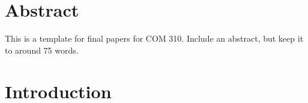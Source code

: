 \documentclass[
	title={TITLE FOR YOUR COM 310 FINAL PAPER},
	keywords={language models}
]{com310final}
\begin{document}
\maketitle

\section*{Abstract}
This is a template for final papers for COM 310.
Include an abstract, but keep it to around 75 words.\\

\keywords

\section{Introduction}\label{sec:introduction}
\end{document}
